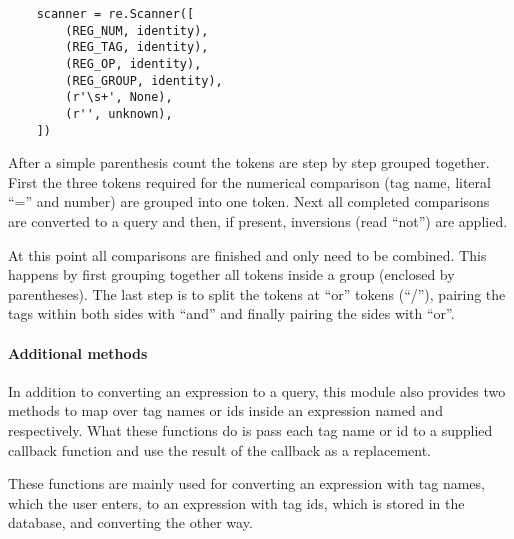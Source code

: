 \begin{verbatim}
    scanner = re.Scanner([
        (REG_NUM, identity),
        (REG_TAG, identity),
        (REG_OP, identity),
        (REG_GROUP, identity),
        (r'\s+', None),
        (r'', unknown),
    ])
\end{verbatim}

After a simple parenthesis count the tokens are step by step grouped together.
First the three tokens required for the numerical comparison (tag name, literal
``='' and number) are grouped into one token. Next all completed comparisons
are converted to a query and then, if present, inversions (read ``not'') are
applied.

At this point all comparisons are finished and only need to be combined. This
happens by first grouping together all tokens inside a group (enclosed by
parentheses). The last step is to split the tokens at ``or'' tokens (``/''),
pairing the tags within both sides with ``and'' and finally pairing the sides
with ``or''.

\paragraph{Additional methods}

In addition to converting an expression to a query, this module also provides
two methods to map over tag names or ids inside an expression named
 and  respectively. What these
functions do is pass each tag name or id to a supplied callback function and
use the result of the callback as a replacement.

These functions are mainly used for converting an expression with tag names,
which the user enters, to an expression with tag ids, which is stored in the
database, and converting the other way.
